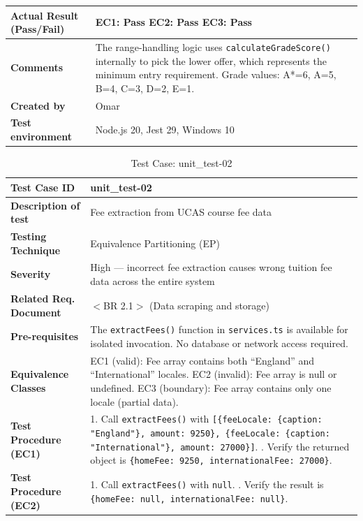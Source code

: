 \begin{table}[h!]
\begin{tabular}{|p{}|p{}|}
\textbf{Actual Result (Pass/Fail)} & EC1: Pass \newline EC2: Pass \newline EC3: Pass \\ \hline
\textbf{Comments} & The range-handling logic uses \texttt{calculateGradeScore()} internally to pick the lower offer, which represents the minimum entry requirement. Grade values: A*=6, A=5, B=4, C=3, D=2, E=1. \\ \hline
\textbf{Created by} & Omar \\ \hline
\textbf{Test environment} & Node.js 20, Jest 29, Windows 10 \\ \hline
\end{tabular}
\end{table}

\begin{table}[h!]
\centering
\caption{Test Case: unit\_test-02}
\begin{tabular}{|p{}|p{}|}
\hline
\textbf{Test Case ID} & unit\_test-02 \\ \hline
\textbf{Description of test} & Fee extraction from UCAS course fee data \\ \hline
\textbf{Testing Technique} & Equivalence Partitioning (EP) \\ \hline
\textbf{Severity} & High --- incorrect fee extraction causes wrong tuition fee data across the entire system \\ \hline
\textbf{Related Req. Document} & $<$BR 2.1$>$ (Data scraping and storage) \\ \hline
\textbf{Pre-requisites} & The \texttt{extractFees()} function in \texttt{services.ts} is available for isolated invocation. No database or network access required. \\ \hline
\textbf{Equivalence Classes} & EC1 (valid): Fee array contains both ``England'' and ``International'' locales. \newline EC2 (invalid): Fee array is null or undefined. \newline EC3 (boundary): Fee array contains only one locale (partial data). \\ \hline
\textbf{Test Procedure (EC1)} & 1. Call \texttt{extractFees()} with \texttt{[\{feeLocale: \{caption: "England"\}, amount: 9250\}, \{feeLocale: \{caption: "International"\}, amount: 27000\}]}. \newline 2. Verify the returned object is \texttt{\{homeFee: 9250, internationalFee: 27000\}}. \\ \hline
\textbf{Test Procedure (EC2)} & 1. Call \texttt{extractFees()} with \texttt{null}. \newline 2. Verify the result is \texttt{\{homeFee: null, internationalFee: null\}}. \\ \hline

\end{tabular}
\end{table}
